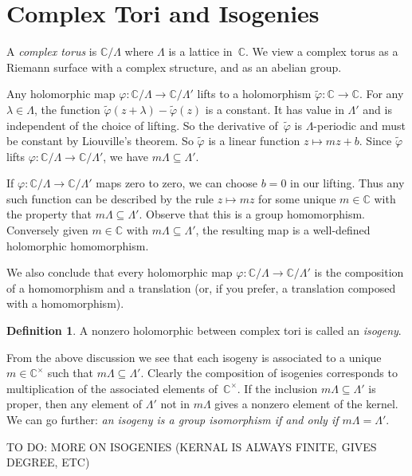 \documentclass{article}
\theoremstyle{plain}
\theoremstyle{definition}
\newtheorem{definition}[theorem]{Definition}
\theoremstyle{remark}
\renewcommand{\phi}{\varphi}
\newcommand{\C}{\mathbb{C}}
\begin{document}
\section{Complex Tori and Isogenies}

A \emph{complex torus} is $\C / \Lambda$ where $\Lambda$ is a lattice in~$\C$.
We view a complex torus as a Riemann surface with a complex structure, and as
an abelian group.

Any holomorphic map $\phi\colon \C / \Lambda\to  \C / \Lambda'$ lifts to a holomorphism
$\tilde \phi\colon \C \to \C$. For any $\lambda \in \Lambda$, the function
$\tilde \phi (z + \lambda) - \tilde \phi (z)$ is a constant. It has value in $\Lambda'$ and is
independent of the choice of lifting.
So the derivative of~$\tilde \phi$ is $\Lambda$-periodic and must be constant by Liouville's
theorem. So $\tilde \phi$ is a linear function $z\mapsto m z + b$.
Since $\tilde \phi$ lifts $\phi\colon \C / \Lambda\to  \C / \Lambda'$, we have $m\Lambda \subseteq \Lambda'$.

If $\phi\colon \C / \Lambda\to  \C / \Lambda'$ maps zero to zero, we can choose $b=0$ in our lifting.
Thus any such function can be described by the rule $z \mapsto m z$ for some unique $m\in \C$
with the property that $m \Lambda \subseteq \Lambda'$. Observe that this is a group homomorphism. Conversely given $m \in \C$ with $m \Lambda \subseteq \Lambda'$, the resulting
map is a well-defined holomorphic homomorphism.

We also conclude that every holomorphic map $\phi\colon \C / \Lambda\to  \C / \Lambda'$
is the composition of a homomorphism and a translation (or, if you prefer, a translation composed with a homomorphism).

\begin{definition}
A nonzero holomorphic between complex tori is called an \emph{isogeny}.
\end{definition}

From the above discussion we see that each isogeny is associated to a unique $m\in\C^\times$
such that $m \Lambda \subseteq \Lambda'$.  Clearly the composition
of isogenies corresponds to multiplication of the associated elements of~$\C^\times$.
If the inclusion $m\Lambda \subseteq \Lambda'$ is proper, 
then any element of $\Lambda'$ not in $m\Lambda $
gives a nonzero element of the kernel. 
We can go further: \emph{an isogeny is a
group isomorphism if and only if $m\Lambda = \Lambda'$}.

TO DO: MORE ON ISOGENIES (KERNAL IS ALWAYS FINITE, GIVES DEGREE, ETC)
\end{document}
